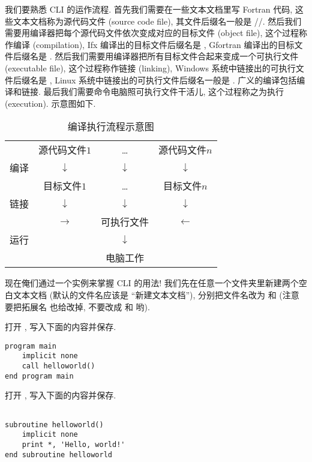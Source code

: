 我们要熟悉 CLI 的运作流程. 首先我们需要在一些文本文档里写 Fortran 代码, 这些文本文档称为源代码文件 (source code file), 其文件后缀名一般是 //. 然后我们需要用编译器把每个源代码文件依次变成对应的目标文件 (object file), 这个过程称作编译 (compilation), Ifx 编译出的目标文件后缀名是 , Gfortran 编译出的目标文件后缀名是 . 然后我们需要用编译器把所有目标文件合起来变成一个可执行文件 (executable file), 这个过程称作链接 (linking), Windows 系统中链接出的可执行文件后缀名是 , Linux 系统中链接出的可执行文件后缀名一般是 . 广义的编译包括编译和链接. 最后我们需要命令电脑照可执行文件干活儿, 这个过程称之为执行 (execution). 示意图如下.
\def\la{$\leftarrow$}
\def\ra{$\rightarrow$}
\def\da{$\downarrow$}
\begin{table}[htbp]
    \centering
    \begin{tabular}{cccc}
        & 源代码文件$1$  & \dots{} & 源代码文件$n$ \\
        编译 & \da{}  & \da{} & \da{} \\
        & 目标文件$1$  & \dots{} & 目标文件$n$ \\
        链接 & \da{} & \da{} & \da{} \\
        & \ra{} & 可执行文件 & \la{} \\
        运行 & & \da{} &  \\
        & & 电脑工作 & \\
    \end{tabular}
    \caption*{编译执行流程示意图}
\end{table}

现在俺们通过一个实例来掌握 CLI 的用法! 我们先在任意一个文件夹里新建两个空白文本文档 (默认的文件名应该是 ``\textsf{新建}\ttt{\ }\textsf{文本文档}''), 分别把文件名改为  和  (注意要把拓展名  也给改掉, 不要改成  和  哟).

打开 , 写入下面的内容并保存.
\begin{lstlisting}
program main
    implicit none
    call helloworld()
end program main
\end{lstlisting}

打开 , 写入下面的内容并保存.
\begin{lstlisting}

subroutine helloworld()
    implicit none
    print *, 'Hello, world!'
end subroutine helloworld
\end{lstlisting}

